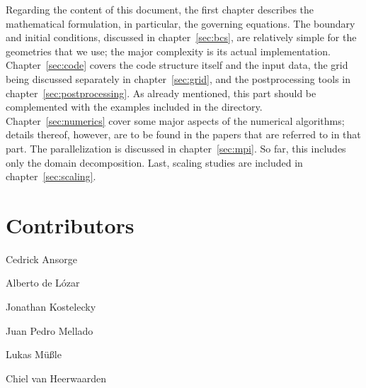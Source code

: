 Regarding the content of this document, the first chapter describes the mathematical formulation, in particular, the governing equations. The boundary and initial conditions, discussed in chapter~\ref{sec:bcs}, are relatively simple for the geometries that we use; the major complexity is its actual implementation. Chapter~\ref{sec:code} covers the code structure itself and the input data, the grid being discussed separately in chapter~\ref{sec:grid}, and the postprocessing tools in chapter~\ref{sec:postprocessing}. As already mentioned, this part should be complemented with the examples included in the directory. Chapter~\ref{sec:numerics} cover some major aspects of the numerical algorithms; details thereof, however, are to be found in the papers that are referred to in that part. The parallelization is discussed in chapter~\ref{sec:mpi}. So far, this includes only the domain decomposition. Last, scaling studies are included in chapter~\ref{sec:scaling}.

\chapter*{Contributors}
\sloppy

Cedrick Ansorge

Alberto de L{\'o}zar

Jonathan Kostelecky

Juan Pedro Mellado

Lukas M{\"u}{\ss}le

Chiel van Heerwaarden
